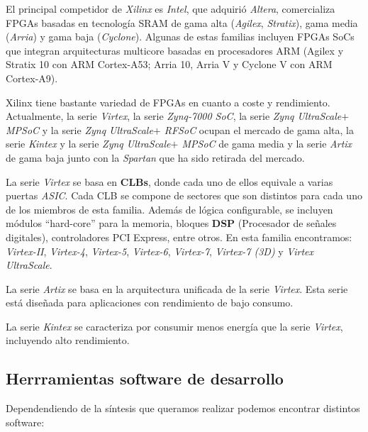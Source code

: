 El principal competidor de \textit{Xilinx} es \textit{Intel}, que adquirió \textit{Altera}, comercializa FPGAs basadas en tecnología SRAM de gama alta 
(\textit{Agilex}, \textit{Stratix}), gama media (\textit{Arria}) y  gama baja (\textit{Cyclone}). Algunas de estas familias incluyen FPGAs SoCs que 
integran arquitecturas multicore basadas en procesadores ARM (Agilex y Stratix 10 con ARM  Cortex-A53; Arria 10, Arria V y Cyclone V con ARM Cortex-A9). 

Xilinx tiene bastante variedad de FPGAs en cuanto a coste y rendimiento. Actualmente, la serie \textit{Virtex}, la serie \textit{Zynq-7000 SoC}, 
la serie \textit{Zynq UltraScale$+$ MPSoC} y la serie \textit{Zynq UltraScale$+$ RFSoC} ocupan el mercado de gama alta, la serie \textit{Kintex} y 
la serie \textit{Zynq UltraScale$+$ MPSoC} de gama media y la serie \textit{Artix} de gama baja junto con la \textit{Spartan} 
que ha sido retirada del mercado.

La serie \textit{Virtex} se basa en \textbf{CLBs}, donde cada uno de ellos equivale a varias puertas \textit{ASIC}. Cada CLB 
se compone de sectores que son distintos para cada uno de los miembros de esta familia. Además de lógica configurable, se incluyen módulos ``hard-core'' 
para la memoria, bloques \textbf{DSP} (Procesador de señales digitales), controladores PCI Express, entre otros. En esta familia encontramos: \textit{Virtex-II}, 
\textit{Virtex-4}, \textit{Virtex-5}, \textit{Virtex-6}, \textit{Virtex-7}, \textit{Virtex-7 (3D)} y \textit{Virtex UltraScale}.

La serie \textit{Artix} se basa en la arquitectura unificada de la serie \textit{Virtex}. Esta serie está diseñada para aplicaciones con rendimiento de bajo consumo.

La serie \textit{Kintex} se caracteriza por consumir menos energía que la serie \textit{Virtex}, incluyendo alto rendimiento.

\subsection{Herrramientas software de desarrollo}
Dependendiendo de la síntesis que queramos realizar podemos encontrar distintos software:

